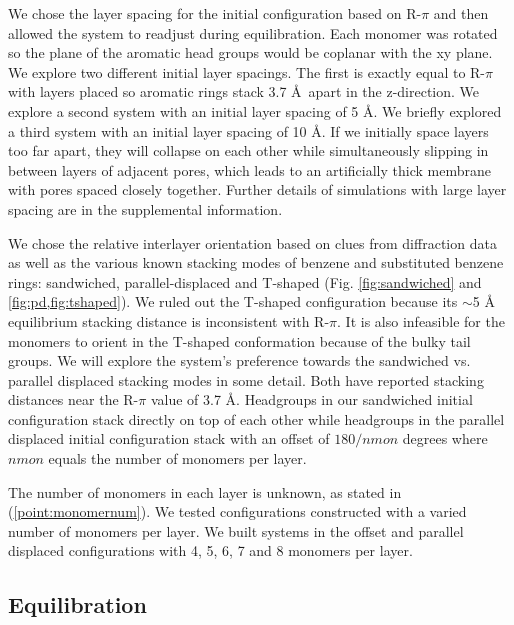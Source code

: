 \documentclass{article}
\newcommand{\angstrom}{\textup{\AA}}
\begin{document}
  We chose the layer spacing for the initial configuration based on R-$\pi$ and
  then allowed the system to readjust during equilibration. Each monomer was
  rotated so the plane of the aromatic head groups would be coplanar with the xy
  plane. We explore two different initial layer spacings. The first is exactly
  equal to R-$\pi$ with layers placed so aromatic rings stack 3.7 \AA~apart in
  the z-direction. We explore a second system with an initial layer spacing of 5
  \AA. We briefly explored a third system with an initial layer spacing of 10
  \AA. If we initially space layers too far apart, they will collapse on each
  other while simultaneously slipping in between layers of adjacent pores, which
  leads to an artificially thick membrane with pores spaced closely together.
  Further details of simulations with large layer spacing are in the supplemental
  information.

  We chose the relative interlayer orientation based on clues from diffraction
  data as well as the various known stacking modes of benzene and substituted
  benzene rings: sandwiched, parallel-displaced and T-shaped
  \cite{sinnokrot_estimates_2002} (Fig. \ref{fig:sandwiched} and
  \ref{fig:pd,fig:tshaped}).  We ruled out the T-shaped configuration because its
  $\sim$5 \angstrom~ equilibrium stacking distance
  \cite{sinnokrot_estimates_2002} is inconsistent with R-$\pi$. It is also
  infeasible for the monomers to orient in the T-shaped conformation because of
  the bulky tail groups. We will explore the system's preference towards the
  sandwiched vs. parallel displaced stacking modes in some detail. Both have
  reported stacking distances near the R-$\pi$ value of 3.7 \angstrom. Headgroups
  in our sandwiched initial configuration stack directly on top of each other
  while headgroups in the parallel displaced initial configuration stack
  with an offset of $180/nmon$ degrees where $nmon$ equals the number of monomers
  per layer.

  The number of monomers in each layer is unknown, as stated in
  (\ref{point:monomernum}). We tested configurations constructed with a varied
  number of monomers per layer. We built systems in the offset and parallel
  displaced configurations with 4, 5, 6, 7 and 8 monomers per layer.

  \subsection{Equilibration}
\end{document}
